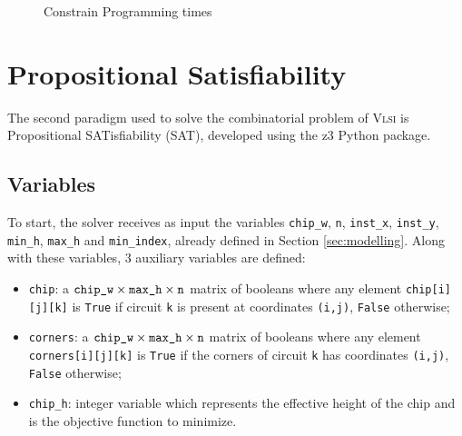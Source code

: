\documentclass[a4paper, 12pt]{article}
\begin{document}
\begin{figure}
    \centering
        \caption{Constrain Programming times}
    \label{fig:cp}  
\end{figure}



\clearpage

\section{Propositional Satisfiability}
The second paradigm used to solve the combinatorial problem of \textsc{Vlsi} is Propositional SATisfiability (SAT), developed using the z3 Python package.



\subsection{Variables}
To start, the solver receives as input the variables \verb|chip_w|, \verb|n|, \verb|inst_x|, \verb|inst_y|, \verb|min_h|, \verb|max_h| and \verb|min_index|, already defined in Section \ref{sec:modelling}. Along with these variables, 3 auxiliary variables are defined:
\begin{itemize}
	\item \verb|chip|: a $\texttt{chip\symbol{95}w} \times \texttt{max\symbol{95}h} \times \texttt{n}$ matrix of booleans where any element \verb|chip[i][j][k]| is \verb|True| if circuit \verb|k| is present at coordinates \verb|(i,j)|, \verb|False| otherwise;
	\item \verb|corners|: a $\texttt{chip\symbol{95}w} \times \texttt{max\symbol{95}h} \times \texttt{n}$ matrix of booleans where any element \verb|corners[i][j][k]| is \verb|True| if the corners of circuit \verb|k| has coordinates \verb|(i,j)|, \verb|False| otherwise;
	\item \verb|chip_h|: integer variable which represents the effective height of the chip and is the objective function to minimize. 
\end{itemize}
\end{document}

